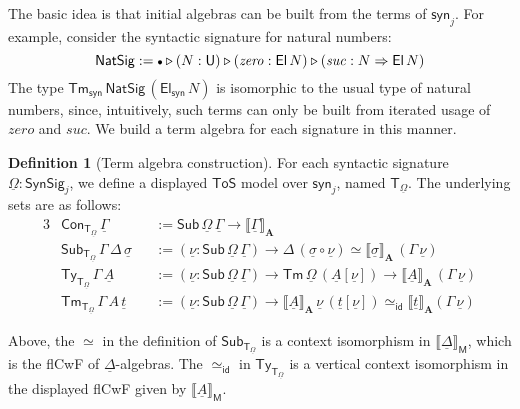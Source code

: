 \documentclass{article}
\theoremstyle{definition}
\newtheorem{definition}{Definition}
\theoremstyle{theorem}
\newcommand{\id}{\mathsf{id}}
\newcommand{\Con}{\mathsf{Con}}
\newcommand{\Sub}{\mathsf{Sub}}
\newcommand{\Tm}{\mathsf{Tm}}
\newcommand{\Ty}{\mathsf{Ty}}
\newcommand{\U}{\mathsf{U}}
\newcommand{\El}{\mathsf{El}}
\newcommand{\ra}{\rightarrow}
\newcommand{\ToS}{\mathsf{ToS}}
\newcommand{\ext}{\triangleright}
\newcommand{\emptycon}{\scaleobj{.75}\bullet}
\newcommand{\NatSig}{\mathsf{NatSig}}
\newcommand{\mi}[1]{\mathit{#1}}
\newcommand{\arri}{\Rightarrow}
\newcommand{\syn}{\mathsf{syn}}
\newcommand{\SynSig}{\mathsf{SynSig}}
\newcommand{\bA}{\boldsymbol{A}}
\newcommand{\bM}{\boldsymbol{\mathsf{M}}}
\newcommand{\bT}{\boldsymbol{\mathsf{T}}}
\newcommand{\ul}[1]{\underline{#1}}
\newcommand{\ulGamma}{\ul{\Gamma}}
\newcommand{\ulDelta}{\ul{\Delta}}
\newcommand{\ulOmega}{\ul{\Omega}}
\newcommand{\ulsigma}{\ul{\sigma}}
\newcommand{\ulnu}{\ul{\nu}}
\newcommand{\ult}{\ul{t}}
\newcommand{\ulA}{\ul{A}}
\newcommand{\llb}{\llbracket}
\newcommand{\rrb}{\rrbracket}
\begin{document}
The basic idea is that initial algebras can be built from the terms of $\syn_j$.
For example, consider the syntactic signature for natural numbers:
\[
\NatSig := \emptycon\ext(N : \U)\ext(\mi{zero} : \El\,N)\ext (\mi{suc} : N
\arri \El\,N)
\]
The type $\Tm_{\syn}\,\NatSig\,(\El_{\syn}\,N)$ is isomorphic to the usual type
of natural numbers, since, intuitively, such terms can only be built from
iterated usage of $\mi{zero}$ and $\mi{suc}$. We build a term algebra for each
signature in this manner.

\begin{definition}[Term algebra construction]
For each syntactic signature $\ulOmega : \SynSig_j$, we define a displayed $\ToS$
model over $\syn_j$, named $\bT_{\ulOmega}$. The underlying sets are as follows:
\begin{alignat*}{3}
  & \Con_{\bT_{\ulOmega}}\,\ulGamma &&:= \Sub\,\ulOmega\,\ulGamma \ra \llb\ulGamma\rrb_{\bA}\\
  & \Sub_{\bT_{\ulOmega}}\,\Gamma\,\Delta\,\ulsigma &&:= (\ulnu : \Sub\,\ulOmega\,\ulGamma)
  \ra \Delta\,(\ulsigma\circ\ulnu) \simeq \llb\ulsigma\rrb_{\bA}\,(\Gamma\,\ulnu)\\
  & \Ty_{\bT_{\ulOmega}}\,\Gamma\,\ulA &&:= (\ulnu : \Sub\,\ulOmega\,\ulGamma) \ra
    \Tm\,\ulOmega\,(\ulA[\ulnu]) \ra \llb\ulA\rrb_{\bA}\,(\Gamma\,\ulnu)\\
  & \Tm_{\bT_{\ulOmega}}\,\Gamma\,A\,\ult &&:= (\ulnu : \Sub\,\ulOmega\,\ulGamma)\ra
    \llb\ulA\rrb_{\bA}\,\ulnu\,(\ult[\ulnu]) \simeq_{\id} \llb\ult\rrb_{\bA} (\Gamma\,\ulnu)
\end{alignat*}

Above, the $\simeq$ in the definition of $\Sub_{\bT_{\ulOmega}}$ is a context isomorphism
in $\llb\ulDelta\rrb_{\bM}$, which is the flCwF of $\ulDelta$-algebras. The
$\simeq_{\id}$ in $\Ty_{\bT_{\ulOmega}}$ is a vertical context isomorphism in the displayed
flCwF given by $\llb\ulA\rrb_{\bM}$.


\end{definition}
\end{document}
